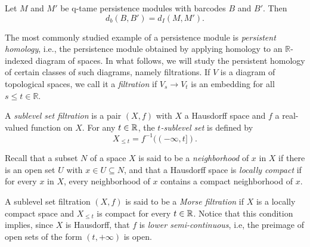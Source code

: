 \begin{thm}
Let $M$ and $M'$ be q-tame persistence modules with barcodes $B$ and $B'$. Then
\[
d_{b}(B,B')= d_{I}(M,M').
\]
\end{thm}

The most commonly studied example of a persistence module is \emph{persistent homology}, i.e., the persistence module obtained by applying homology to an $\mathbb{R}$-indexed diagram of spaces. In what follows, we will study the persistent homology of certain classes of such diagrams, namely filtrations. If $V$ is a diagram of topological spaces, we call it a \emph{filtration} if $V_s\to V_t$ is an embedding for all $s\leq t\in\mathbb{R}$. 

A \textit{sublevel set filtration} is a pair $(X, f)$ with $X$ a Hausdorff space and $f$ a real-valued function on $X$.
For any $t \in \mathbb{R}$, the \textit{$t$-sublevel set} is defined by 
\begin{equation*}
X_{\leq t} = f^{-1}((-\infty, t]).
\end{equation*}

Recall that a subset $N$ of a space $X$ is said to be a \textit{neighborhood} of $x$ in $X$ if there is an open set $U$ with $x \in U \subseteq N$, and that a Hausdorff space is \textit{locally compact} if for every $x$ in $X$, every neighborhood of $x$ contains a compact neighborhood of $x$.

A sublevel set filtration $(X, f)$ is said to be a \textit{Morse filtration} if $X$ is a locally compact space and $X_{\leq t}$ is compact for every $t \in \mathbb{R}$.
Notice that this condition implies, since $X$ is Hausdorff, that $f$ is \textit{lower semi-continuous}, i.e, the preimage of open sets of the form $(t, +\infty)$ is open.